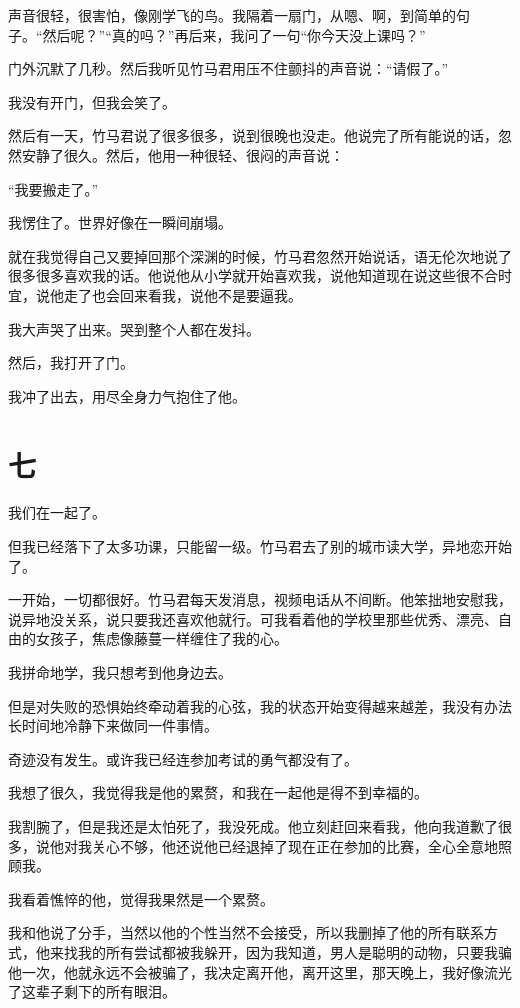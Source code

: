\documentclass[12pt, a4paper]{ctexart}
\begin{document}
声音很轻，很害怕，像刚学飞的鸟。我隔着一扇门，从嗯、啊，到简单的句子。“然后呢？”“真的吗？”再后来，我问了一句“你今天没上课吗？”

门外沉默了几秒。然后我听见竹马君用压不住颤抖的声音说：“请假了。”

我没有开门，但我会笑了。

然后有一天，竹马君说了很多很多，说到很晚也没走。他说完了所有能说的话，忽然安静了很久。然后，他用一种很轻、很闷的声音说：

“我要搬走了。”

我愣住了。世界好像在一瞬间崩塌。

就在我觉得自己又要掉回那个深渊的时候，竹马君忽然开始说话，语无伦次地说了很多很多喜欢我的话。他说他从小学就开始喜欢我，说他知道现在说这些很不合时宜，说他走了也会回来看我，说他不是要逼我。

我大声哭了出来。哭到整个人都在发抖。

然后，我打开了门。

我冲了出去，用尽全身力气抱住了他。

\section*{七}

我们在一起了。

但我已经落下了太多功课，只能留一级。竹马君去了别的城市读大学，异地恋开始了。

一开始，一切都很好。竹马君每天发消息，视频电话从不间断。他笨拙地安慰我，说异地没关系，说只要我还喜欢他就行。可我看着他的学校里那些优秀、漂亮、自由的女孩子，焦虑像藤蔓一样缠住了我的心。

我拼命地学，我只想考到他身边去。

但是对失败的恐惧始终牵动着我的心弦，我的状态开始变得越来越差，我没有办法长时间地冷静下来做同一件事情。

奇迹没有发生。或许我已经连参加考试的勇气都没有了。

我想了很久，我觉得我是他的累赘，和我在一起他是得不到幸福的。

我割腕了，但是我还是太怕死了，我没死成。他立刻赶回来看我，他向我道歉了很多，说他对我关心不够，他还说他已经退掉了现在正在参加的比赛，全心全意地照顾我。

我看着憔悴的他，觉得我果然是一个累赘。

我和他说了分手，当然以他的个性当然不会接受，所以我删掉了他的所有联系方式，他来找我的所有尝试都被我躲开，因为我知道，男人是聪明的动物，只要我骗他一次，他就永远不会被骗了，我决定离开他，离开这里，那天晚上，我好像流光了这辈子剩下的所有眼泪。
\end{document}
